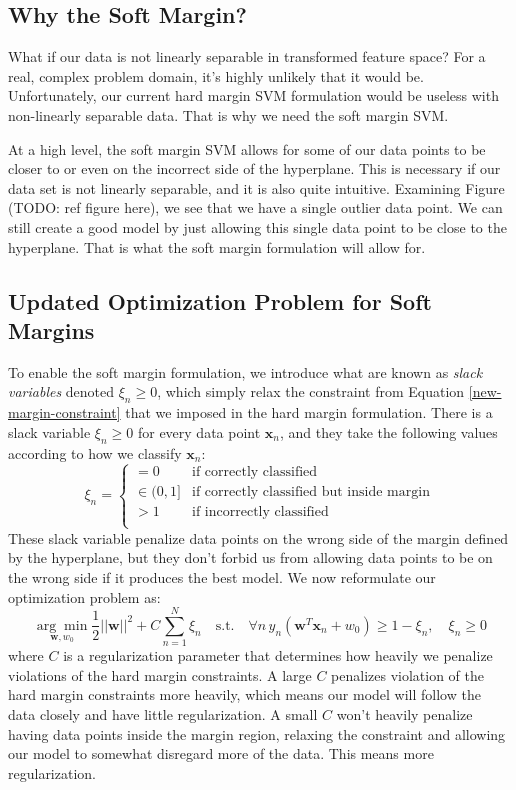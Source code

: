 \subsection{Why the Soft Margin?}
What if our data is not linearly separable in transformed feature space? For a real, complex problem domain, it's highly unlikely that it would be. Unfortunately, our current hard margin SVM formulation would be useless with non-linearly separable data. That is why we need the soft margin SVM.

At a high level, the soft margin SVM allows for some of our data points to be closer to or even on the incorrect side of the hyperplane. This is necessary if our data set is not linearly separable, and it is also quite intuitive. Examining Figure (TODO: ref figure here), we see that we have a single outlier data point. We can still create a good model by just allowing this single data point to be close to the hyperplane. That is what the soft margin formulation will allow for.

\subsection{Updated Optimization Problem for Soft Margins}
To enable the soft margin formulation, we introduce what are known as \textit{slack variables} denoted $\xi_{n} \geq 0$, which simply relax the constraint from Equation \ref{new-margin-constraint} that we imposed in the hard margin formulation. There is a slack variable $\xi_{n} \geq 0$ for every data point $\textbf{x}_{n}$, and they take the following values according to how we classify $\textbf{x}_{n}$:
\begin{equation} \label{slack-variable-values}
	\xi_{n} = \begin{cases}
	 	= 0 & \text{if correctly classified} \\
		\in (0, 1] & \text{if correctly classified but inside margin} \\
		> 1 & \text{if incorrectly classified} \\
	\end{cases}
\end{equation}
These slack variable penalize data points on the wrong side of the margin defined by the hyperplane, but they don't forbid us from allowing data points to be on the wrong side if it produces the best model. We now reformulate our optimization problem as:
\begin{equation} \label{soft-margin-optimization-problem}
	\underset{\textbf{w}, w_{0}}{\arg\min} \frac{1}{2} ||\textbf{w}||^{2} + C \sum_{n=1}^{N} \xi_{n} \quad \text{s.t.} \quad \forall n \, y_{n}(\textbf{w}^{T}\textbf{x}_{n} + w_{0}) \geq 1 - \xi_{n}, \quad \xi_{n} \geq 0
\end{equation}
where $C$ is a regularization parameter that determines how heavily we penalize violations of the hard margin constraints. A large $C$ penalizes violation of the hard margin constraints more heavily, which means our model will follow the data closely and have little regularization. A small $C$ won't heavily penalize having data points inside the margin region, relaxing the constraint and allowing our model to somewhat disregard more of the data. This means more regularization.

